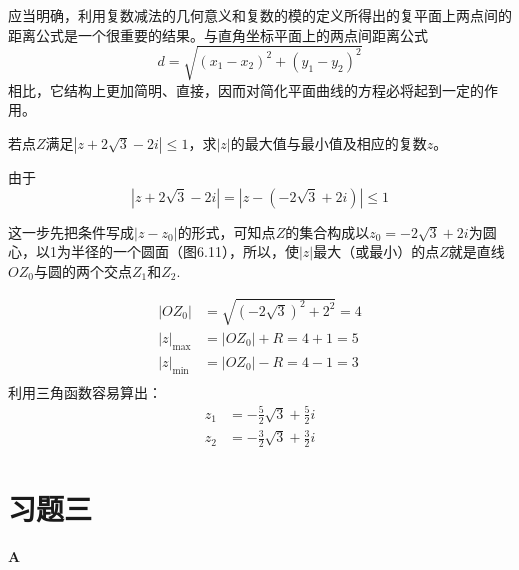 应当明确，利用复数减法的几何意义和复数的模的定义所得出的复平面上两点间的距离公式是一个很重要的结果。与直角坐标平面上的两点间距离公式
\[d=\sqrt{(x_1-x_2)^2+(y_1-y_2)^2}\]
相比，它结构上更加简明、直接，因而对简化平面曲线的方程必将起到一定的作用。


\begin{example}
    若点$Z$满足$|z+2\sqrt{3}-2i|\le 1$，求$|z|$的最大值与最小值及相应的复数$z$。
\end{example}

\begin{solution}
    由于
\[|z+2\sqrt{3}-2i|=\left|z-\left(-2\sqrt{3}+2i\right)\right|\le 1\]

这一步先把条件写成$|z-z_0|$的形式，可知点$Z$的集合构成以$z_0=-2\sqrt{3}+2i$为圆心，以1为半径的一个圆面（图6.11），所以，使$|z|$最大（或最小）的点$Z$就是直线$OZ_0$与圆的两个交点$Z_1$和$Z_2$. 

\noindent
\begin{minipage}{.55\textwidth}
 \[\begin{split}
    |OZ_0|&=\sqrt{\left(-2\sqrt{3}\right)^2+2^2}=4\\
    |z|_{\max}&=|OZ_0|+R=4+1=5\\
    |z|_{\min}&=|OZ_0|-R=4-1=3\\
\end{split}\]
利用三角函数容易算出：
\[\begin{split}
    z_1&=-\frac{5}{2}\sqrt{3}+\frac{5}{2}i\\
    z_2&=-\frac{3}{2}\sqrt{3}+\frac{3}{2}i
\end{split} \]   
\end{minipage}\hfill
\begin{minipage}{.45\textwidth}
    \centering
\end{minipage}
\end{solution}

\section*{习题三}
\begin{center}
    \bfseries A
\end{center}

